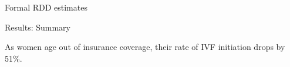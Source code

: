 \documentclass[notes,11pt, aspectratio=169]{beamer}
\newenvironment{wideitemize}{\itemize\addtolength{\itemsep}{0.4em}}{\enditemize}
\begin{document}
\begin{frame}{Formal RDD estimates}
	\begin{figure}
	\end{figure}
	
\end{frame}

\begin{frame}{Results: Summary}
\begin{wideitemize}
\item As women age out of insurance coverage, their rate of IVF initiation drops by 51\%. 

\end{wideitemize}	
\end{frame}
\end{document}
